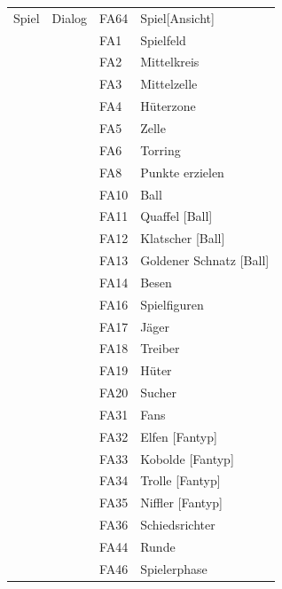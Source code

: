 \begin{figure}[H]
    \centering
    \begin{tabular}{|p{} p{} p{} p{}|}
        \hline
        Spiel & Dialog & FA64 & Spiel[Ansicht]\\
        & & FA1 & Spielfeld\\
        & & FA2 & Mittelkreis\\
        & & FA3 & Mittelzelle\\
        & & FA4 & Hüterzone\\
        & & FA5 & Zelle\\
        & & FA6 & Torring\\
        & & FA8 & Punkte erzielen\\
        & & FA10 & Ball\\
        & & FA11 & Quaffel [Ball]\\
        & & FA12 & Klatscher [Ball]\\
        & & FA13 & Goldener Schnatz [Ball]\\
        & & FA14 & Besen\\
        & & FA16 & Spielfiguren\\
        & & FA17 & Jäger\\
        & & FA18 & Treiber\\
        & & FA19 & Hüter\\
        & & FA20 & Sucher\\
        & & FA31 & Fans\\
        & & FA32 & Elfen [Fantyp]\\
        & & FA33 & Kobolde [Fantyp]\\
        & & FA34 & Trolle [Fantyp]\\
        & & FA35 & Niffler [Fantyp]\\
        & & FA36 & Schiedsrichter\\
        & & FA44 & Runde\\
        & & FA46 & Spielerphase\\\hline
    \end{tabular}
\end{figure}

